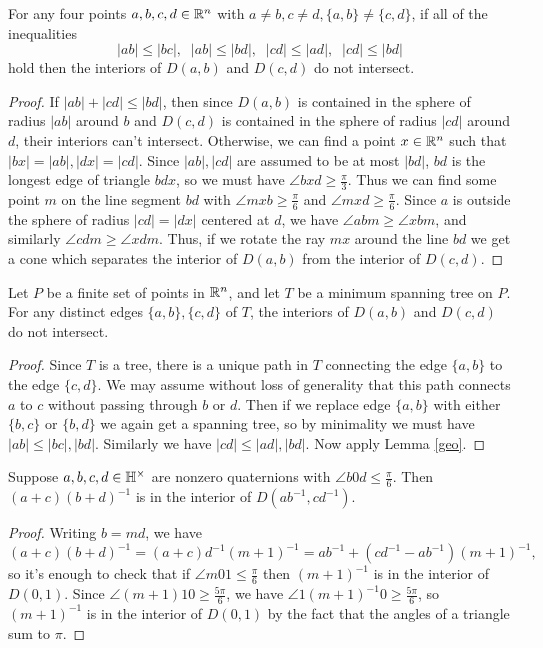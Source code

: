 \begin{lem}\label{geo} For any four points $a,b,c,d\in \mathbb{R}^n$ with $a\ne b, c\ne d, \{a,b\}\ne \{c,d\}$, if all of the inequalities
\[
|ab| \le |bc|,\;\; |ab| \le |bd|,\;\; |cd| \le |ad|,\;\; |cd| \le |bd|
\]
hold then the interiors of $D(a,b)$ and $D(c,d)$ do not intersect.
\end{lem}
\begin{proof} If $|ab|+|cd| \le |bd|$, then since $D(a,b)$ is contained in the sphere of radius $|ab|$ around $b$ and $D(c,d)$ is contained in the sphere of radius $|cd|$ around $d$, their interiors can't intersect. Otherwise, we can find a point $x\in \mathbb{R}^n$ such that $|bx| = |ab|, |dx| = |cd|$. Since $|ab|, |cd|$ are assumed to be at most $|bd|$, $bd$ is the longest edge of triangle $bdx$, so we must have $\angle bxd \ge \frac{\pi}{3}$. Thus we can find some point $m$ on the line segment $bd$ with $\angle mxb \ge \frac{\pi}{6}$ and $\angle mxd \ge \frac{\pi}{6}$. Since $a$ is outside the sphere of radius $|cd| = |dx|$ centered at $d$, we have $\angle abm \ge \angle xbm$, and similarly $\angle cdm \ge \angle xdm$. Thus, if we rotate the ray $mx$ around the line $bd$ we get a cone which separates the interior of $D(a,b)$ from the interior of $D(c,d)$.
\end{proof}

\begin{cor}\label{tree} Let $P$ be a finite set of points in $\mathbb{R}^n$, and let $T$ be a minimum spanning tree on $P$. For any distinct edges $\{a,b\},\{c,d\}$ of $T$, the interiors of $D(a,b)$ and $D(c,d)$ do not intersect.
\end{cor}
\begin{proof} Since $T$ is a tree, there is a unique path in $T$ connecting the edge $\{a,b\}$ to the edge $\{c,d\}$. We may assume without loss of generality that this path connects $a$ to $c$ without passing through $b$ or $d$. Then if we replace edge $\{a,b\}$ with either $\{b,c\}$ or $\{b,d\}$ we again get a spanning tree, so by minimality we must have $|ab| \le |bc|, |bd|$. Similarly we have $|cd| \le |ad|, |bd|$. Now apply Lemma \ref{geo}.
\end{proof}

\begin{prop}\label{diamond} Suppose $a,b,c,d \in \mathbb{H}^\times$ are nonzero quaternions with $\angle b0d \le \frac{\pi}{6}$. Then $(a+c)(b+d)^{-1}$ is in the interior of $D(ab^{-1},cd^{-1})$.
\end{prop}
\begin{proof} Writing $b=md$, we have
\[
(a+c)(b+d)^{-1} = (a+c)d^{-1}(m+1)^{-1} = ab^{-1} + (cd^{-1}-ab^{-1})(m+1)^{-1},
\]
so it's enough to check that if $\angle m01 \le \frac{\pi}{6}$ then $(m+1)^{-1}$ is in the interior of $D(0,1)$. Since $\angle (m+1)10 \ge \frac{5\pi}{6}$, we have $\angle 1(m+1)^{-1}0 \ge \frac{5\pi}{6}$, so $(m+1)^{-1}$ is in the interior of $D(0,1)$ by the fact that the angles of a triangle sum to $\pi$.
\end{proof}

